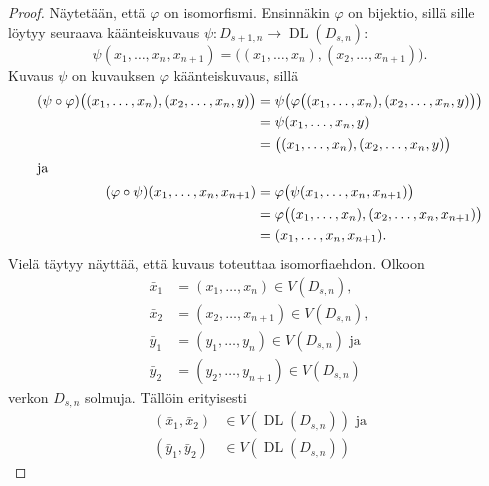 \documentclass[finnish]{tktltiki2}
\theoremstyle{definition}
\theoremstyle{remark}
\newcommand{\from}{\colon}
\newcommand{\compose}{\circ}
\DeclareMathOperator{\DL}{DL}
\newcommand{\Dsn}{D_{s,n}}
\newcommand{\Dssn}{D_{s+1,n}}
\begin{document}
\begin{proof}
    Näytetään, että $\varphi$ on isomorfismi. Ensinnäkin $\varphi$ on bijektio,
    sillä sille löytyy seuraava käänteiskuvaus $\psi \from \Dssn \to
    \DL(\Dsn)$:
    \begin{equation*}
        \psi(x_1, \dots, x_n, x_{n+1}) =
        \big(
            (x_1, \dots, x_n), (x_2, \dots, x_{n+1})
        \big).
    \end{equation*}
    Kuvaus $\psi$ on kuvauksen $\varphi$ käänteiskuvaus, sillä
    \begin{align*}
        (\psi \compose \varphi)\big(
                                   (x_1, \dots, x_n), (x_2, \dots, x_n, y)
                               \big)
            &= \psi\big(
                       \varphi\big(
                                  (x_1, \dots, x_n), (x_2, \dots, x_n, y)
                              \big)
                   \big) \\
            &= \psi(x_1, \dots, x_n, y) \\
            &= \big(
                   (x_1, \dots, x_n), (x_2, \dots, x_n, y)
               \big) \\
\intertext{ja}
        (\varphi \compose \psi)(x_1, \dots, x_n, x_{n+1})
            &= \varphi\big(
                          \psi(x_1, \dots, x_n, x_{n+1})
                      \big) \\
            &= \varphi\big(
                          (x_1, \dots, x_n), (x_2, \dots, x_n, x_{n+1})
                      \big) \\
            &= (x_1, \dots, x_n, x_{n+1}).
    \end{align*}
    Vielä täytyy näyttää, että kuvaus toteuttaa isomorfiaehdon. Olkoon
    \newcommand{\x}{\bar{x}}
    \newcommand{\y}{\bar{y}}
    \begin{align*}
        \x_1 &= (x_1, \dots, x_n)     \in V(\Dsn), \\
        \x_2 &= (x_2, \dots, x_{n+1}) \in V(\Dsn), \\
        \y_1 &= (y_1, \dots, y_n)     \in V(\Dsn) \text{ ja} \\
        \y_2 &= (y_2, \dots, y_{n+1}) \in V(\Dsn)
    \end{align*}
    verkon $\Dsn$ solmuja. Tällöin erityisesti
    \begin{align*}
        (\x_1,\x_2) &\in V(\DL(\Dsn)) \text{ ja} \\
        (\y_1,\y_2) &\in V(\DL(\Dsn))
    \end{align*}

\end{proof}
\end{document}
